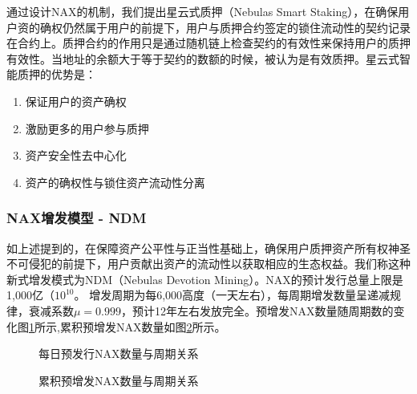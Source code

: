 通过设计NAX的机制，我们提出星云式质押（Nebulas Smart Staking），在确保用户资的确权仍然属于用户的前提下，用户与质押合约签定的锁住流动性的契约记录在合约上。质押合约的作用只是通过随机链上检查契约的有效性来保持用户的质押有效性。当地址的余额大于等于契约的数额的时候，被认为是有效质押。星云式智能质押的优势是：
\begin{enumerate}[\hspace{2cm}(a)]
    \item 保证用户的资产确权
    \item 激励更多的用户参与质押
    \item 资产安全性去中心化
    \item 资产的确权性与锁住资产流动性分离
\end{enumerate}

\subsubsection{NAX增发模型 - NDM}
如上述提到的，在保障资产公平性与正当性基础上，确保用户质押资产所有权神圣不可侵犯的前提下，用户贡献出资产的流动性以获取相应的生态权益。我们称这种新式增发模式为NDM（Nebulas Devotion Mining）。NAX的预计发行总量上限是1,000亿（\(10^{10}\)。 增发周期为每6,000高度（一天左右），每周期增发数量呈递减规律，衰减系数$\mu=0.999$，预计12年左右发放完全。预增发NAX数量随周期数的变化图\ref{dist}所示,累积预增发NAX数量如图\ref{acc}所示。

\begin{figure}
\centering
    \caption{每日预发行NAX数量与周期关系}\label{dist}
\end{figure}


\begin{figure}
\centering
\caption{累积预增发NAX数量与周期关系}\label{acc}
\end{figure}

